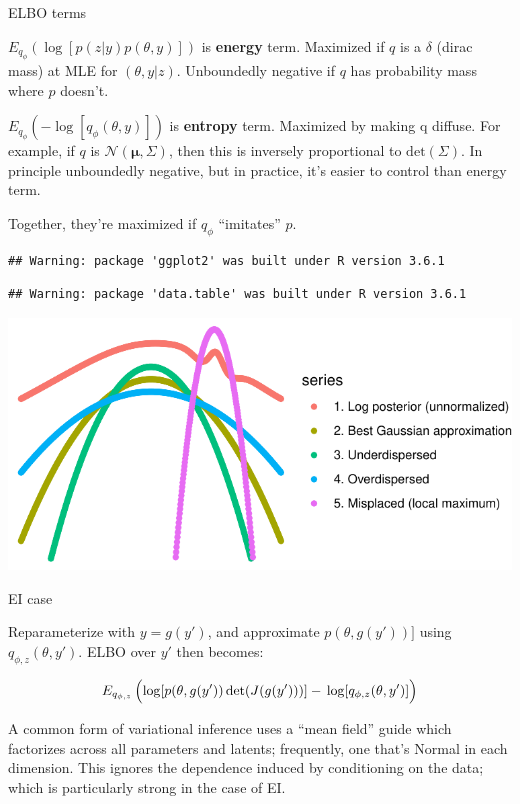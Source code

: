 \documentclass[
  ignorenonframetext,
]{beamer}
\begin{document}
\begin{frame}[fragile]{ELBO terms}
\protect\hypertarget{elbo-terms}{}

\(E_{q_\phi}\left(\log[p(z|y)p(\theta,y)]\right)\) is \textbf{energy}
term. Maximized if \(q\) is a \(\delta\) (dirac mass) at MLE for
\((\theta,y|z)\). Unboundedly negative if \(q\) has probability mass
where \(p\) doesn't.

\(E_{q_\phi}\left(-\log[q_\phi(\theta,y)]\right)\) is \textbf{entropy}
term. Maximized by making q diffuse. For example, if \(q\) is
\(\mathcal{N}(\bm{\mu},\Sigma)\), then this is inversely proportional to
\(\mathrm{det}(\Sigma)\). In principle unboundedly negative, but in
practice, it's easier to control than energy term.

Together, they're maximized if \(q_\phi\) ``imitates'' \(p\).

\begin{verbatim}
## Warning: package 'ggplot2' was built under R version 3.6.1
\end{verbatim}

\begin{verbatim}
## Warning: package 'data.table' was built under R version 3.6.1
\end{verbatim}

\includegraphics{defense_files/figure-beamer/unnamed-chunk-24-1.pdf}

\end{frame}

\begin{frame}{EI case}
\protect\hypertarget{ei-case}{}

Reparameterize with \(y=g(y')\), and approximate \(p(\theta,g(y'))]\)
using \(q_{\phi,z}(\theta,y')\). ELBO over \(y'\) then becomes:

\[E_{q_{\phi,z}}\left(\log[p(\theta,g(y'))\operatorname{det}(J(g(y')))]-\vphantom{\Big|}\log
[q_{\phi,z}(\theta,y')]\right)\]

A common form of variational inference uses a ``mean field'' guide which
factorizes across all parameters and latents; frequently, one that's
Normal in each dimension. This ignores the dependence induced by
conditioning on the data; which is particularly strong in the case of
EI.

\end{frame}
\end{document}
